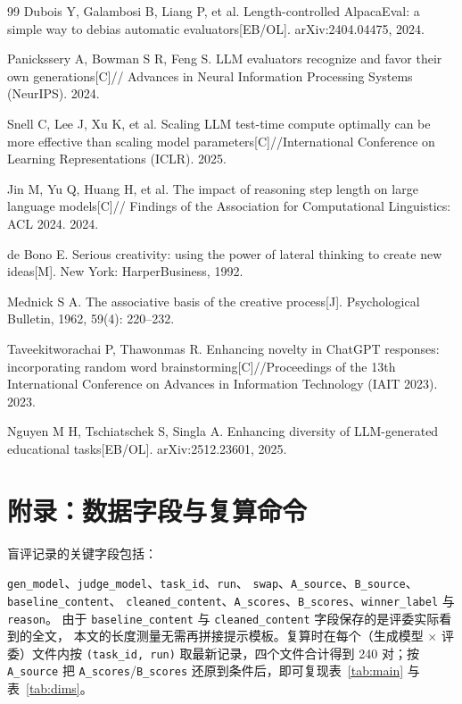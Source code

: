 \documentclass[UTF8,11pt,a4paper]{ctexart}
\begin{document}
\begin{thebibliography}{99}
Dubois Y, Galambosi B, Liang P, et al. Length-controlled AlpacaEval: a simple way to debias automatic
evaluators[EB/OL]. arXiv:2404.04475, 2024.

Panickssery A, Bowman S R, Feng S. LLM evaluators recognize and favor their own generations[C]//
Advances in Neural Information Processing Systems (NeurIPS). 2024.

Snell C, Lee J, Xu K, et al. Scaling LLM test-time compute optimally can be more effective than
scaling model parameters[C]//International Conference on Learning Representations (ICLR). 2025.

Jin M, Yu Q, Huang H, et al. The impact of reasoning step length on large language models[C]//
Findings of the Association for Computational Linguistics: ACL 2024. 2024.

de Bono E. Serious creativity: using the power of lateral thinking to create new ideas[M].
New York: HarperBusiness, 1992.

Mednick S A. The associative basis of the creative process[J]. Psychological Bulletin, 1962,
59(4): 220--232.

Taveekitworachai P, Thawonmas R. Enhancing novelty in ChatGPT responses: incorporating random
word brainstorming[C]//Proceedings of the 13th International Conference on Advances in
Information Technology (IAIT 2023). 2023.

Nguyen M H, Tschiatschek S, Singla A. Enhancing diversity of LLM-generated educational
tasks[EB/OL]. arXiv:2512.23601, 2025.

\end{thebibliography}

\clearpage
\appendix
\section*{附录：数据字段与复算命令}

盲评记录的关键字段包括：\par
\texttt{gen\_model}、\texttt{judge\_model}、\texttt{task\_id}、\texttt{run}、
\texttt{swap}、\texttt{A\_source}、\texttt{B\_source}、\texttt{baseline\_content}、
\texttt{cleaned\_content}、\texttt{A\_scores}、\texttt{B\_scores}、\texttt{winner\_label} 与 \texttt{reason}。
由于 \texttt{baseline\_content} 与 \texttt{cleaned\_content} 字段保存的是评委实际看到的全文，
本文的长度测量无需再拼接提示模板。复算时在每个（生成模型 $\times$ 评委）文件内按
\texttt{(task\_id, run)} 取最新记录，四个文件合计得到 240 对；按 \texttt{A\_source} 把
\texttt{A\_scores}/\texttt{B\_scores} 还原到条件后，即可复现表~\ref{tab:main} 与表~\ref{tab:dims}。
\end{document}
